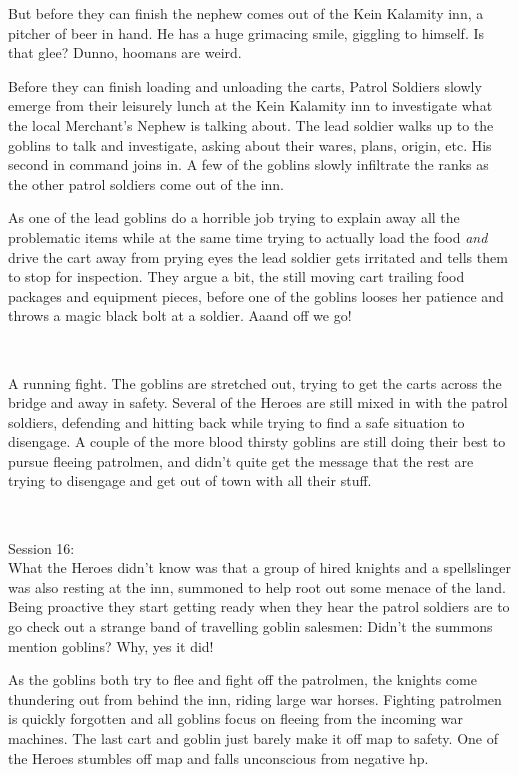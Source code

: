 \noindent But before they can finish the nephew comes out of the Kein Kalamity inn, a pitcher of beer in hand. He has a huge grimacing smile, giggling to himself. Is that glee? Dunno, hoomans are weird.

Before they can finish loading and unloading the carts, Patrol Soldiers slowly emerge from their leisurely lunch at the Kein Kalamity inn to investigate what the local Merchant's Nephew is talking about. The lead soldier walks up to the goblins to talk and investigate, asking about their wares, plans, origin, etc. His second in command joins in. A few of the goblins slowly infiltrate the ranks as the other patrol soldiers come out of the inn.

As one of the lead goblins do a horrible job trying to explain away all the problematic items while at the same time trying to actually load the food \emph{and} drive the cart away from prying eyes the lead soldier gets irritated and tells them to stop for inspection. They argue a bit, the still moving cart trailing food packages and equipment pieces, before one of the goblins looses her patience and throws a magic black bolt at a soldier. Aaand off we go!

\

A running fight. The goblins are stretched out, trying to get the carts across the bridge and away in safety. Several of the Heroes are still mixed in with the patrol soldiers, defending and hitting back while trying to find a safe situation to disengage. A couple of the more blood thirsty goblins are still doing their best to pursue fleeing patrolmen, and didn't quite get the message that the rest are trying to disengage and get out of town with all their stuff.

\

Session 16:\\                                                           %
What the Heroes didn't know was that a group of hired knights and a spellslinger was also resting at the inn, summoned to help root out some menace of the land. Being proactive they start getting ready when they hear the patrol soldiers are to go check out a strange band of travelling goblin salesmen: Didn't the summons mention goblins? Why, yes it did!

As the goblins both try to flee and fight off the patrolmen, the knights come thundering out from behind the inn, riding large war horses. Fighting patrolmen is quickly forgotten and all goblins focus on fleeing from the incoming war machines. The last cart and goblin just barely make it off map to safety. One of the Heroes stumbles off map and falls unconscious from negative hp.

